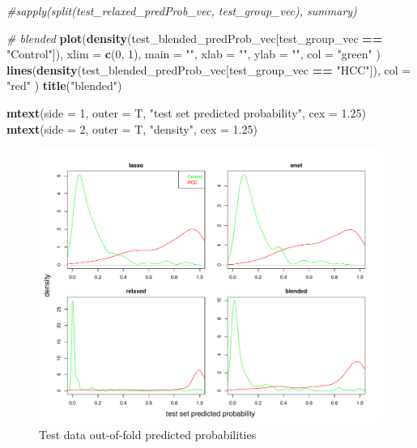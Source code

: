 \documentclass[
]{book}
\newenvironment{Shaded}{\begin{snugshade}}{\end{snugshade}}
\newcommand{\CommentTok}[1]{\textcolor[rgb]{0.56,0.35,0.01}{\textit{#1}}}
\newcommand{\DataTypeTok}[1]{\textcolor[rgb]{0.13,0.29,0.53}{#1}}
\newcommand{\DecValTok}[1]{\textcolor[rgb]{0.00,0.00,0.81}{#1}}
\newcommand{\FloatTok}[1]{\textcolor[rgb]{0.00,0.00,0.81}{#1}}
\newcommand{\KeywordTok}[1]{\textcolor[rgb]{0.13,0.29,0.53}{\textbf{#1}}}
\newcommand{\NormalTok}[1]{#1}
\newcommand{\OperatorTok}[1]{\textcolor[rgb]{0.81,0.36,0.00}{\textbf{#1}}}
\newcommand{\StringTok}[1]{\textcolor[rgb]{0.31,0.60,0.02}{#1}}
\begin{document}
\begin{Shaded}
\begin{Highlighting}[]
\CommentTok{\#sapply(split(test\_relaxed\_predProb\_vec, test\_group\_vec), summary)}


\CommentTok{\# blended}
\KeywordTok{plot}\NormalTok{(}\KeywordTok{density}\NormalTok{(test\_blended\_predProb\_vec[test\_group\_vec }\OperatorTok{==}\StringTok{ "Control"}\NormalTok{]),}
  \DataTypeTok{xlim =} \KeywordTok{c}\NormalTok{(}\DecValTok{0}\NormalTok{, }\DecValTok{1}\NormalTok{), }\DataTypeTok{main =} \StringTok{""}\NormalTok{, }\DataTypeTok{xlab =} \StringTok{""}\NormalTok{, }\DataTypeTok{ylab =} \StringTok{""}\NormalTok{, }\DataTypeTok{col =} \StringTok{"green"}
\NormalTok{)}
\KeywordTok{lines}\NormalTok{(}\KeywordTok{density}\NormalTok{(test\_blended\_predProb\_vec[test\_group\_vec }\OperatorTok{==}\StringTok{ "HCC"}\NormalTok{]),}
  \DataTypeTok{col =} \StringTok{"red"}
\NormalTok{)}
\KeywordTok{title}\NormalTok{(}\StringTok{"blended"}\NormalTok{)}

\KeywordTok{mtext}\NormalTok{(}\DataTypeTok{side =} \DecValTok{1}\NormalTok{, }\DataTypeTok{outer =}\NormalTok{ T, }\StringTok{"test set predicted probability"}\NormalTok{, }\DataTypeTok{cex =} \FloatTok{1.25}\NormalTok{)}
\KeywordTok{mtext}\NormalTok{(}\DataTypeTok{side =} \DecValTok{2}\NormalTok{, }\DataTypeTok{outer =}\NormalTok{ T, }\StringTok{"density"}\NormalTok{, }\DataTypeTok{cex =} \FloatTok{1.25}\NormalTok{)}
\end{Highlighting}
\end{Shaded}

\begin{figure}
\centering
\includegraphics{Static/figures/testOOFprobs-1.pdf}
\caption{\label{fig:testOOFprobs}Test data out-of-fold predicted probabilities}
\end{figure}
\end{document}

